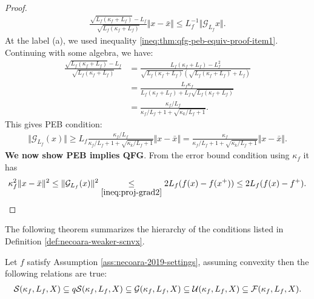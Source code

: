 \documentclass[12pt]{report}
\begin{document}
\begin{proof}
{\begin{align*}
                    \frac{\sqrt{L_f(\kappa_f + L_f)} - L_f}{\sqrt{L_f(\kappa_f + L_f)}}
                    \Vert x - \bar x\Vert 
                    \le
                    L_f^{-1} \Vert \mathcal G_{L_f}x\Vert. 
                \end{align*}
                }
                At the label (a), we used inequality \eqref{ineq:thm:qfg-peb-equiv-proof-item1}.
                Continuing with some algebra, we have: 
                \begin{align*}
                    \frac{\sqrt{L_f(\kappa_f + L_f)} - L_f}{\sqrt{L_f(\kappa_f + L_f)}} 
                    &= \frac{L_f(\kappa_f + L_f) - L_f^2}{\sqrt{L_f(\kappa_f + L_f)}(\sqrt{L_f(\kappa_f + L_f)} + L_f)}
                    \\
                    &= \frac{L_f \kappa_f}{L_f(\kappa_f + L_f) + L_f\sqrt{L_f(\kappa_f + L_f)}}
                    \\
                    &= \frac{\kappa_f/L_f}{\kappa_f/L_f + 1 + \sqrt{\kappa_k/L_f + 1}}. 
                \end{align*}
                This gives PEB condition: 
                \begin{align*}
                    \Vert \mathcal G_{L_f}(x)\Vert \ge L_f 
                    \frac{\kappa_f/L_f}{\kappa_f/L_f + 1 + \sqrt{\kappa_k/L_f + 1}}\Vert x - \bar x\Vert
                    = 
                    \frac{\kappa_f}{\kappa_f/L_f + 1 + \sqrt{\kappa_k/L_f + 1}}\Vert x - \bar x\Vert. 
                \end{align*}
                \textbf{We now show PEB implies QFG}. 
                From the error bound condition using $\kappa_f$ it has
                \begin{align*}
                    \kappa_f^2\Vert x - \bar x\Vert^2
                    \le \Vert \mathcal G_{L_f}(x)\Vert^2
                    \underset{\eqref{ineq:proj-grad2}}{\le }
                    2L_f(f(x) - f(x^+)) \le 2L_f(f(x) - f^+). 
                \end{align*}
            \end{proof}
            \par
            The following theorem summarizes the hierarchy of the conditions listed in Definition \ref{def:necoara-weaker-scnvx}. 
            \begin{theorem}\label{thm:wcnvx-hierach}
                Let $f$ satisfy Assumption \ref{ass:necoara-2019-settings}, assuming convexity then the following relations are true: 
                \begin{align*}
                    \mathcal S(\kappa_f, L_f, X) 
                    \subseteq q\mathcal{S}(\kappa_f, L_f, X)
                    \subseteq \mathcal G(\kappa_f, L_f, X) 
                    \subseteq \mathcal U(\kappa_f, L_f, X) 
                    \subseteq \mathcal F(\kappa_f, L_f, X). 
                \end{align*}
            \end{theorem}
\end{document}
